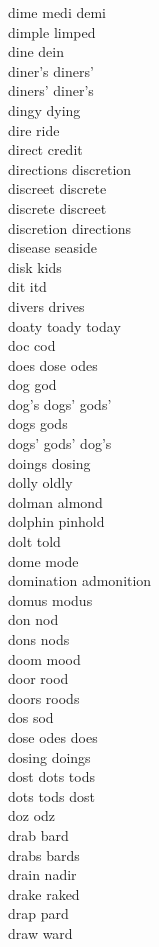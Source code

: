 dime medi demi\\
dimple limped\\
dine dein\\
diner's diners'\\
diners' diner's\\
dingy dying\\
dire ride\\
direct credit\\
directions discretion\\
discreet discrete\\
discrete discreet\\
discretion directions\\
disease seaside\\
disk kids\\
dit itd\\
divers drives\\
doaty toady today\\
doc cod\\
does dose odes\\
dog god\\
dog's dogs' gods'\\
dogs gods\\
dogs' gods' dog's\\
doings dosing\\
dolly oldly\\
dolman almond\\
dolphin pinhold\\
dolt told\\
dome mode\\
domination admonition\\
domus modus\\
don nod\\
dons nods\\
doom mood\\
door rood\\
doors roods\\
dos sod\\
dose odes does\\
dosing doings\\
dost dots tods\\
dots tods dost\\
doz odz\\
drab bard\\
drabs bards\\
drain nadir\\
drake raked\\
drap pard\\
draw ward\\
